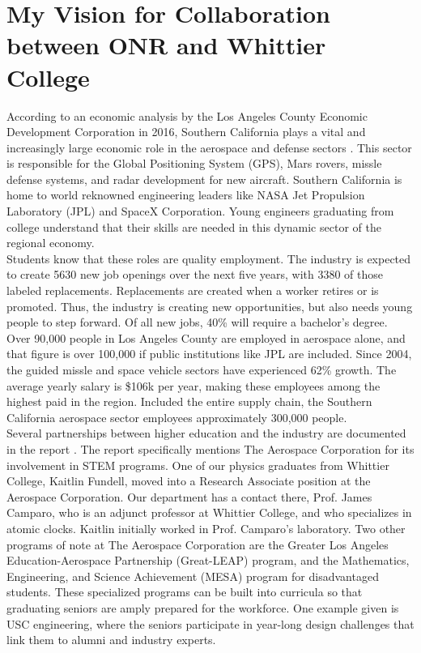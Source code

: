 \documentclass[../../../main.tex]{subfiles}
\begin{document}
\section{My Vision for Collaboration between ONR and Whittier College}
\label{sec:naval_collaboration}

According to an economic analysis by the Los Angeles County Economic Development Corporation in 2016, Southern California plays a vital and increasingly large economic role in the aerospace and defense sectors \cite{laedc}.  This sector is responsible for the Global Positioning System (GPS), Mars rovers, missle defense systems, and radar development for new aircraft.  Southern California is home to world reknowned engineering leaders like NASA Jet Propulsion Laboratory (JPL) and SpaceX Corporation.  Young engineers graduating from college understand that their skills are needed in this dynamic sector of the regional economy.
\\
\vspace{0.25cm}
Students know that these roles are quality employment.  The industry is expected to create 5630 new job openings over the next five years, with 3380 of those labeled replacements.  Replacements are created when a worker retires or is promoted.  Thus, the industry is creating new opportunities, but also needs young people to step forward.  Of all new jobs, 40\% will require a bachelor's degree.  Over 90,000 people in Los Angeles County are employed in aerospace alone, and that figure is over 100,000 if public institutions like JPL are included.  Since 2004, the guided missle and space vehicle sectors have experienced 62\% growth.  The average yearly salary is \$106k per year, making these employees among the highest paid in the region.  Included the entire supply chain, the Southern California aerospace sector employees approximately 300,000 people.
\\
\vspace{0.25cm}
Several partnerships between higher education and the industry are documented in the report \cite{laedc}.  The report specifically mentions The Aerospace Corporation for its involvement in STEM programs.  One of our physics graduates from Whittier College, Kaitlin Fundell, moved into a Research Associate position at the Aerospace Corporation.  Our department has a contact there, Prof. James Camparo, who is an adjunct professor at Whittier College, and who specializes in atomic clocks.  Kaitlin initially worked in Prof. Camparo's laboratory.  Two other programs of note at The Aerospace Corporation are the Greater Los Angeles Education-Aerospace Partnership (Great-LEAP) program, and the Mathematics, Engineering, and Science Achievement (MESA) program for disadvantaged students.  These specialized programs can be built into curricula so that graduating seniors are amply prepared for the workforce.  One example given is USC engineering, where the seniors participate in year-long design challenges that link them to alumni and industry experts.
\end{document}
